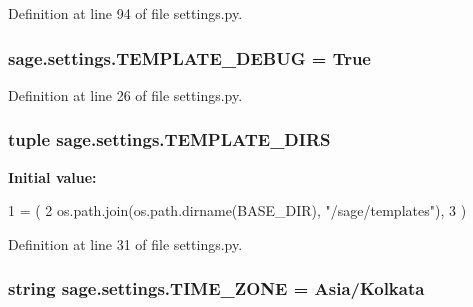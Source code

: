 Definition at line 94 of file settings.\+py.

\hypertarget{namespacesage_1_1settings_a74c98bee40b9b06d51e44be6df73eb46}{}
\subsubsection[{T\+E\+M\+P\+L\+A\+T\+E\+\_\+\+D\+E\+B\+U\+G}]{\setlength{\rightskip}{0pt plus 5cm}sage.\+settings.\+T\+E\+M\+P\+L\+A\+T\+E\+\_\+\+D\+E\+B\+U\+G = True}\label{namespacesage_1_1settings_a74c98bee40b9b06d51e44be6df73eb46}


Definition at line 26 of file settings.\+py.

\hypertarget{namespacesage_1_1settings_addc90c15790d385d304972f1b3098a86}{}
\subsubsection[{T\+E\+M\+P\+L\+A\+T\+E\+\_\+\+D\+I\+R\+S}]{\setlength{\rightskip}{0pt plus 5cm}tuple sage.\+settings.\+T\+E\+M\+P\+L\+A\+T\+E\+\_\+\+D\+I\+R\+S}\label{namespacesage_1_1settings_addc90c15790d385d304972f1b3098a86}
{\bfseries Initial value\+:}
\begin{DoxyCode}
1 = (
2     os.path.join(os.path.dirname(BASE\_DIR), \textcolor{stringliteral}{"/sage/templates"}),
3 )
\end{DoxyCode}


Definition at line 31 of file settings.\+py.

\hypertarget{namespacesage_1_1settings_a07421ef620becc4c93753901abdf83c0}{}
\subsubsection[{T\+I\+M\+E\+\_\+\+Z\+O\+N\+E}]{\setlength{\rightskip}{0pt plus 5cm}string sage.\+settings.\+T\+I\+M\+E\+\_\+\+Z\+O\+N\+E = \textquotesingle{}Asia/Kolkata\textquotesingle{}}\label{namespacesage_1_1settings_a07421ef620becc4c93753901abdf83c0}


